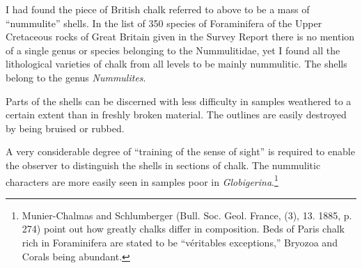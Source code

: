 \documentclass[a4paper, 12pt, oneside]{article}
\begin{document}
I had found the piece of British chalk referred to above to be a mass of ``nummulite'' shells. In the list of 350 species of Foraminifera of the Upper Cretaceous rocks of Great Britain given in the Survey Report there is no mention of a single genus or species belonging to the Nummulitidae, yet I found all the lithological varieties of chalk from all levels to be mainly nummulitic. The shells belong to the genus \emph{Nummulites}.

Parts of the shells can be discerned with less difficulty in samples weathered to a certain extent than in freshly broken material. The outlines are easily destroyed by being bruised or rubbed.

A very considerable degree of ``training of the sense of sight'' is required to enable the observer to distinguish the shells in sections of chalk. The nummulitic characters are more easily seen in samples poor in \emph{Globigerina}.\footnote{Munier-Chalmas and Schlumberger (Bull. Soc. Geol. France, (3), 13. 1885, p. 274) point out how greatly chalks differ in composition. Beds of Paris chalk rich in Foraminifera are stated to be ``véritables exceptions,'' Bryozoa and Corals being abundant.}
\end{document}
